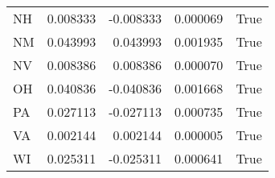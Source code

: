 \begin{table}
\begin{tabular}{lrrrl}
      NH &   0.008333 & -0.008333 &       0.000069 &          True \\
      NM &   0.043993 &  0.043993 &       0.001935 &          True \\
      NV &   0.008386 &  0.008386 &       0.000070 &          True \\
      OH &   0.040836 & -0.040836 &       0.001668 &          True \\
      PA &   0.027113 & -0.027113 &       0.000735 &          True \\
      VA &   0.002144 &  0.002144 &       0.000005 &          True \\
      WI &   0.025311 & -0.025311 &       0.000641 &          True \\
\bottomrule
\end{tabular}
\end{table}
